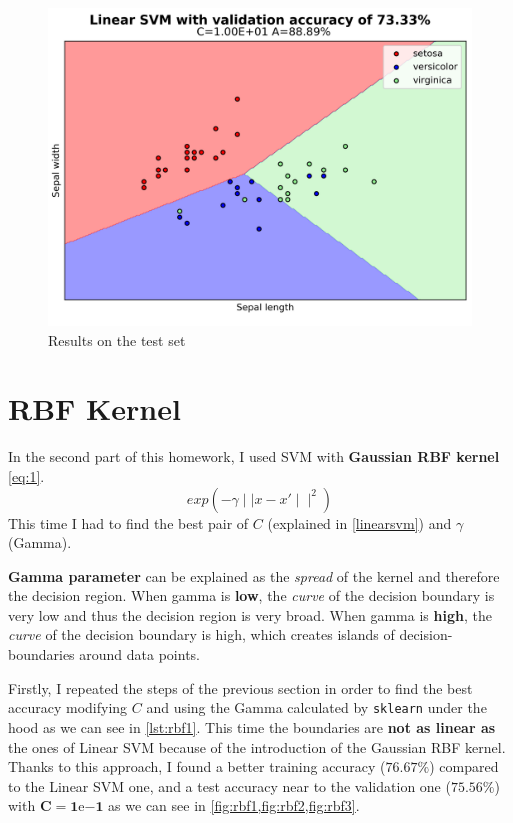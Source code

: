 \documentclass[a4paper, 11pt]{article}
\begin{document}
	\begin{figure}[ht!]
		\centering
		\includegraphics[width=0.7\paperwidth]{img/fig01c.png}
		\caption{Results on the test set}
		\label{fig:linear3}
	\end{figure}
		
	\section{RBF Kernel}
	
	In the second part of this homework, I used SVM with \textbf{Gaussian RBF kernel} \vref{eq:1}.
	\begin{equation} \label{eq:1}
	exp(-\gamma \mid\mid x-x' \mid\mid^2)
	\end{equation}
	This time I had to find the best pair of $C$ (explained in \vref{linearsvm})  and $\gamma$ (Gamma).
	
	\textbf{Gamma parameter} can be explained as the \textit{spread} of the kernel and therefore the decision region. When gamma is \textbf{low}, the \textit{curve} of the decision boundary is very low and thus the decision region is very broad. When gamma is \textbf{high}, the \textit{curve} of the decision boundary is high, which creates islands of decision-boundaries around data points.
	
	Firstly, I repeated the steps of the previous section in order to find the best accuracy modifying $C$ and using the Gamma calculated by \texttt{sklearn} under the hood as we can see in \vref{lst:rbf1}.  This time the boundaries are \textbf{not as linear as} the ones of Linear SVM because of the introduction of the Gaussian RBF kernel. Thanks to this approach, I found a better training accuracy ($\boldsymbol{76.67\%}$) compared to the Linear SVM one, and a test accuracy near to the validation one ($\boldsymbol{75.56\%}$) with $\boldsymbol{C=1\mathrm{e}{-1}}$ as we can see in \vref{fig:rbf1,fig:rbf2,fig:rbf3}.
	
\end{document}
